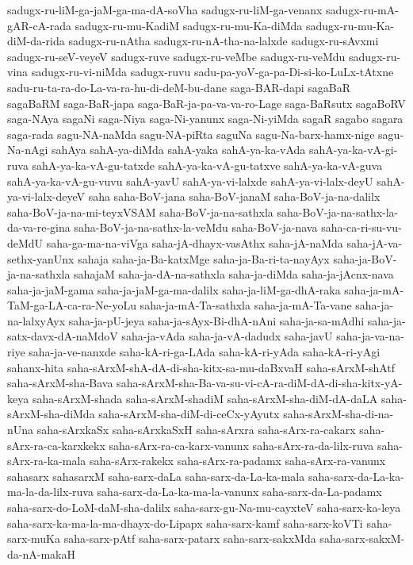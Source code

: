 {sadugx-ru-liM-ga-jaM-ga-ma-dA-soVha
sadugx-ru-liM-ga-venanx
sadugx-ru-mA-gAR-cA-rada
sadugx-ru-mu-KadiM
sadugx-ru-mu-Ka-diMda
sadugx-ru-mu-Ka-diM-da-rida
sadugx-ru-nAtha
sadugx-ru-nA-tha-na-lalxde
sadugx-ru-sAvxmi
sadugx-ru-seV-veyeV
sadugx-ruve
sadugx-ru-veMbe
sadugx-ru-veMdu
sadugx-ru-vina
sadugx-ru-vi-niMda
sadugx-ruvu
sadu-pa-yoV-ga-pa-Di-si-ko-LuLx-tAtxne
sadu-ru-ta-ra-do-La-va-ra-hu-di-deM-bu-dane
saga-BAR-dapi
sagaBaR
sagaBaRM
saga-BaR-japa
saga-BaR-ja-pa-va-va-ro-Lage
saga-BaRsutx
sagaBoRV
saga-NAya
sagaNi
saga-Niya
saga-Ni-yanunx
saga-Ni-yiMda
sagaR
sagabo
sagara
saga-rada
sagu-NA-naMda
sagu-NA-piRta
saguNa
sagu-Na-barx-hamx-nige
sagu-Na-nAgi
sahAya
sahA-ya-diMda
sahA-yaka
sahA-ya-ka-vAda
sahA-ya-ka-vA-gi-ruva
sahA-ya-ka-vA-gu-tatxde
sahA-ya-ka-vA-gu-tatxve
sahA-ya-ka-vA-guva
sahA-ya-ka-vA-gu-vuvu
sahA-yavU
sahA-ya-vi-lalxde
sahA-ya-vi-lalx-deyU
sahA-ya-vi-lalx-deyeV
saha
saha-BoV-jana
saha-BoV-janaM
saha-BoV-ja-na-dalilx
saha-BoV-ja-na-mi-teyxVSAM
saha-BoV-ja-na-sathxla
saha-BoV-ja-na-sathx-la-da-va-re-gina
saha-BoV-ja-na-sathx-la-veMdu
saha-BoV-ja-nava
saha-ca-ri-su-vu-deMdU
saha-ga-ma-na-viVga
saha-jA-dhayx-vasAthx
saha-jA-naMda
saha-jA-va-sethx-yanUnx
sahaja
saha-ja-Ba-katxMge
saha-ja-Ba-ri-ta-nayAyx
saha-ja-BoV-ja-na-sathxla
sahajaM
saha-ja-dA-na-sathxla
saha-ja-diMda
saha-ja-jAcnx-nava
saha-ja-jaM-gama
saha-ja-jaM-ga-ma-dalilx
saha-ja-liM-ga-dhA-raka
saha-ja-mA-TaM-ga-LA-ca-ra-Ne-yoLu
saha-ja-mA-Ta-sathxla
saha-ja-mA-Ta-vane
saha-ja-na-lalxyAyx
saha-ja-pU-jeya
saha-ja-sAyx-Bi-dhA-nAni
saha-ja-sa-mAdhi
saha-ja-satx-davx-dA-naMdoV
saha-ja-vAda
saha-ja-vA-dadudx
saha-javU
saha-ja-va-na-riye
saha-ja-ve-nanxde
saha-kA-ri-ga-LAda
saha-kA-ri-yAda
saha-kA-ri-yAgi
sahanx-hita
saha-sArxM-shA-dA-di-sha-kitx-sa-mu-daBxvaH
saha-sArxM-shAtf
saha-sArxM-sha-Bava
saha-sArxM-sha-Ba-va-su-vi-cA-ra-diM-dA-di-sha-kitx-yA-keya
saha-sArxM-shada
saha-sArxM-shadiM
saha-sArxM-sha-diM-dA-daLA
saha-sArxM-sha-diMda
saha-sArxM-sha-diM-di-ceCx-yAyutx
saha-sArxM-sha-di-na-nUna
saha-sArxkaSx
saha-sArxkaSxH
saha-sArxra
saha-sArx-ra-cakarx
saha-sArx-ra-ca-karxkekx
saha-sArx-ra-ca-karx-vanunx
saha-sArx-ra-da-lilx-ruva
saha-sArx-ra-ka-mala
saha-sArx-rakekx
saha-sArx-ra-padamx
saha-sArx-ra-vanunx
sahasarx
sahasarxM
saha-sarx-daLa
saha-sarx-da-La-ka-mala
saha-sarx-da-La-ka-ma-la-da-lilx-ruva
saha-sarx-da-La-ka-ma-la-vanunx
saha-sarx-da-La-padamx
saha-sarx-do-LoM-daM-sha-dalilx
saha-sarx-gu-Na-mu-cayxteV
saha-sarx-ka-leya
saha-sarx-ka-ma-la-ma-dhayx-do-Lipapx
saha-sarx-kamf
saha-sarx-koVTi
saha-sarx-muKa
saha-sarx-pAtf
saha-sarx-patarx
saha-sarx-sakxMda
saha-sarx-sakxM-da-nA-makaH
}

